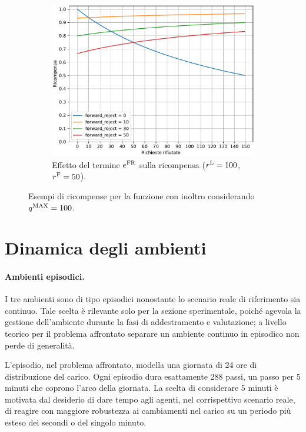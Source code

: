 \begin{figure}
    \begin{subfigure}{.6\textwidth}
        \centering
        \includegraphics[width=\linewidth]{assets/4/reward_fw_forward_reject.pdf}
        \caption{Effetto del termine $e^\textnormal{FR}$ sulla ricompensa (${r^\textnormal{L} = 100}$, ${r^\textnormal{F} = 50}$).}
        \label{fig:4_reward_fw_forward_reject}
    \end{subfigure}
    
    \caption[Esempi di ricompense per la funzione con inoltro]{Esempi di ricompense per la funzione con inoltro considerando ${q^\textnormal{MAX} = 100}$.}
    \label{fig:4_reward_fw}
\end{figure}

\section{Dinamica degli ambienti}
\label{sec:4_dinamica_ambienti}

\paragraph{Ambienti episodici.} I tre ambienti sono di tipo episodici nonostante lo scenario reale di riferimento sia continuo. Tale scelta è rilevante solo per la sezione sperimentale, poiché agevola la gestione dell'ambiente durante la fasi di addestramento e valutazione; a livello teorico per il problema affrontato separare un ambiente continuo in episodico non perde di generalità.

L'episodio, nel problema affrontato, modella una giornata di 24 ore di distribuzione del carico. Ogni episodio dura esattamente 288 passi, un passo per 5 minuti che coprono l'arco della giornata. La scelta di considerare 5 minuti è motivata dal desiderio di dare tempo agli agenti, nel corrispettivo scenario reale, di reagire con maggiore robustezza ai cambiamenti nel carico su un periodo più esteso dei secondi o del singolo minuto.

